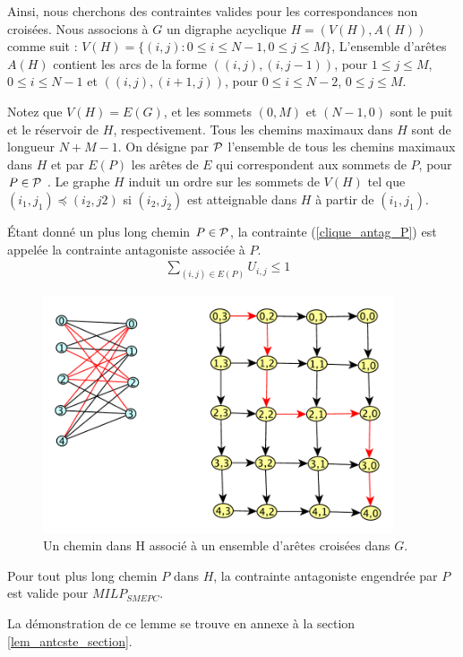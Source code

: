 {{Ainsi, nous cherchons des contraintes valides pour les correspondances non croisées.
Nous associons à $G$ un digraphe acyclique $H = (V (H), A(H))$ comme suit :
$V(H)=\{(i,j) :  0 \leq i \leq N-1, 0 \leq j \leq M\}$, L'ensemble d'arêtes $A(H)$ contient les arcs de la forme $((i,j), (i,j-1))$, pour $1 \leq j \leq M$, $0 \leq i \leq N-1$ et $((i, j), (i+1, j))$, pour $0 \leq i \leq N-2$, $0\leq j \leq M$.

Notez que $V(H) = E(G)$, et les sommets $(0,M)$ et $(N-1,0)$ sont le puit et le réservoir de $H$,
respectivement. Tous les chemins maximaux dans $H$ sont de longueur $N +M-1$. On désigne par $\cal P$ l'ensemble de tous les chemins maximaux dans $H$ et par $E(P)$ les arêtes de $E$ qui correspondent aux sommets de $P$, pour $P \in \cal P$ .
Le graphe $H$ induit un ordre sur les sommets de $V(H)$ tel que $(i_1, j_1) \preceq (i_2, j2)$ si $(i_2, j_2)$
est atteignable dans $H$ à partir de $(i_1, j_1)$.

Étant donné un plus long chemin $P \in \cal P$, la contrainte (\ref{clique_antag_P}) est appelée la contrainte antagoniste associée à $P$.
\begin{eqnarray}
\sum_{(i, j) \in E(P)} U_{i,j} \le 1 &\label{clique_antag_P}
\end{eqnarray}

\begin{figure}[H]
	\centerline{
		\includegraphics[height=7cm]{images_these/NonCrossingM.pdf}}
	\caption[Un chemin dans $H$ associé à un ensemble d'arêtes croisées dans G]{ Un chemin dans H associé à un ensemble d'arêtes croisées dans $G$.}
	\label{NonCrossingM}
\end{figure}

\begin{Lem}\label{lem_antcste}
	Pour tout plus long chemin $P$ dans $H$, la contrainte antagoniste engendrée par $P$ est valide pour $MILP_{SMEPC}$.
\end{Lem}
La démonstration de ce lemme se trouve en annexe à la section \ref{lem_antcste_section}.

}}
